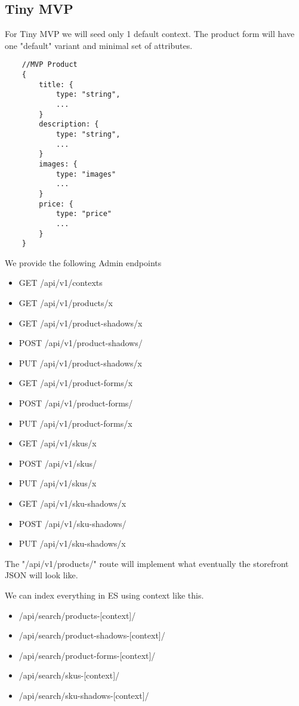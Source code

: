 \documentclass[11pt]{article}
\begin{document}
\newpage
\subsection{Tiny MVP}

For Tiny MVP we will seed only 1 default context. The product form will have one
"default" variant and minimal set of attributes.

\begin{lstlisting}
    //MVP Product 
    {
        title: { 
            type: "string",
            ...
        }
        description: { 
            type: "string",
            ...  
        }
        images: { 
            type: "images"
            ...  
        }
        price: {
            type: "price"
            ...
        }
    }
\end{lstlisting}
\newpage

We provide the following Admin endpoints

\begin{itemize}
    \item GET /api/v1/contexts
    \item GET /api/v1/products/x
    \item GET /api/v1/product-shadows/x
    \item POST /api/v1/product-shadows/
    \item PUT /api/v1/product-shadows/x
    \item GET /api/v1/product-forms/x
    \item POST /api/v1/product-forms/
    \item PUT /api/v1/product-forms/x
    \item GET /api/v1/skus/x
    \item POST /api/v1/skus/
    \item PUT /api/v1/skus/x
    \item GET /api/v1/sku-shadows/x
    \item POST /api/v1/sku-shadows/
    \item PUT /api/v1/sku-shadows/x
\end{itemize}

The "/api/v1/products/" route will implement what eventually the storefront JSON will look
like.

We can index everything in ES using context like this.

\begin{itemize}
    \item /api/search/products-[context]/
    \item /api/search/product-shadows-[context]/
    \item /api/search/product-forms-[context]/
    \item /api/search/skus-[context]/
    \item /api/search/sku-shadows-[context]/
\end{itemize}
\end{document}
